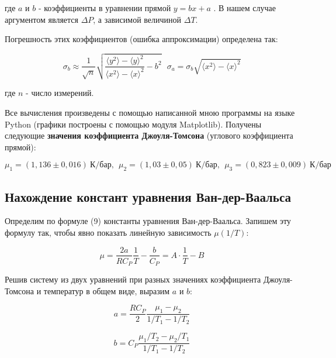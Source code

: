 \documentclass{article}
\begin{document}
где $a$ и $b$ - коэффициенты в уравнении прямой $y = bx + a$ . В нашем случае аргументом является $\Delta P$, а зависимой величиной $\Delta T$.

Погрешность этих коэффициентов (ошибка аппроксимации) определена так:

\begin{equation}
	\sigma_b \approx \dfrac{1}{\sqrt{n}}\sqrt{\frac{\langle y^2 \rangle - \langle y \rangle^2}{\langle x^{2} \rangle - \langle x \rangle^{2}} - b^2} \ \ \ \sigma_a = \sigma_b \sqrt{\langle x^{2} \rangle - \langle x \rangle^{2}}
\end{equation}

где $n$ - число измерений.

Все вычисления произведены с помощью написанной мною программы на языке Python (графики построены с помощью модуля Matplotlib). Получены следующие \textbf{значения коэффициента Джоуля-Томсона} (углового коэффициента прямой):

\begin{equation*}
	\boxed{\mu_1 = (1,136 \pm 0,016) \ К/бар, \ \ \mu_2 = (1,03 \pm 0,05) \ К/бар, \ \ \mu_3 = (0,823 \pm 0,009) \ К/бар}
\end{equation*}



\subsection*{Нахождение констант уравнения Ван-дер-Ваальса}

\hspace{4mm} Определим по формуле (9) константы уравнения Ван-дер-Ваальса. Запишем эту формулу так, чтобы явно показать линейную зависимость $\mu(1/T)$:

\begin{equation*}
	\mu = \frac{2a}{RC_P} \frac{1}{T} - \frac{b}{C_P} = A \cdot \frac{1}{T} - B
\end{equation*}

Решив систему из двух уравнений при разных значениях коэффициента Джоуля-Томсона и температур в общем виде, выразим $a$ и $b$:

\begin{equation*}
	a = \frac{R C_P}{2} \frac{\mu_1 - \mu_2}{1/T_1 - 1/T_2}
\end{equation*}

\begin{equation*}
	b = C_P \frac{\mu_1/T_2- \mu_2/T_1}{1/T_1 - 1/T_2}
\end{equation*}
\end{document}
